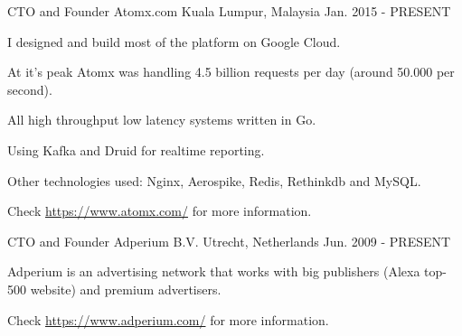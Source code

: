

\begin{cventries}

  \cventry
    {CTO and Founder} %
    {Atomx.com} %
    {Kuala Lumpur, Malaysia} %
    {Jan. 2015 - PRESENT} %
    {
      \begin{cvitems} %
				\item {I designed and build most of the platform on Google Cloud.}
				\item {At it's peak Atomx was handling 4.5 billion requests per day (around 50.000 per second).}
				\item {All high throughput low latency systems written in Go.}
				\item {Using Kafka and Druid for realtime reporting.}
				\item {Other technologies used: Nginx, Aerospike, Redis, Rethinkdb and MySQL.}
				\item {Check \href{https://www.atomx.com/}{\textcolor{link}{https://www.atomx.com/}} for more information.}
      \end{cvitems}
    }

  \cventry
    {CTO and Founder} %
    {Adperium B.V.} %
    {Utrecht, Netherlands} %
    {Jun. 2009 - PRESENT} %
    {
      \begin{cvitems} %
				\item {Adperium is an advertising network that works with big publishers (Alexa top-500 website) and premium advertisers.}
				\item {Check \href{https://www.adperium.com/}{\textcolor{link}{https://www.adperium.com/}} for more information.}
      \end{cvitems}
    }


\end{cventries}
